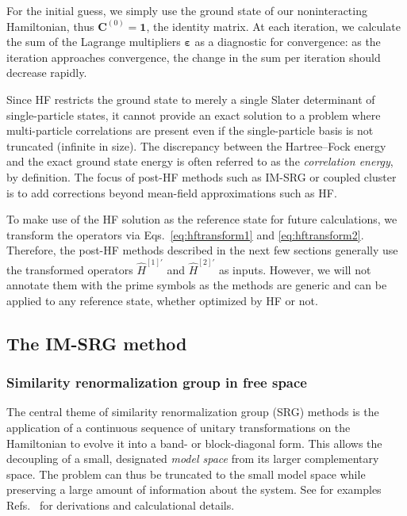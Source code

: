For the initial guess, we simply use the ground state of our noninteracting Hamiltonian, thus $\bm{C}^{(0)} = \bm{1}$, the identity matrix.  At each iteration, we calculate the sum of the Lagrange multipliers $\bm{\varepsilon}$ as a diagnostic for convergence: as the iteration approaches convergence, the change in the sum per iteration should decrease rapidly.

Since HF restricts the ground state to merely a single Slater determinant of single-particle states, it cannot provide an exact solution to a problem where multi-particle correlations are present even if the single-particle basis is not truncated (infinite in size).  The discrepancy between the Hartree--Fock energy and the exact ground state energy is often referred to as the \textit{correlation energy}, by definition.  The focus of post-HF methods such as IM-SRG or coupled cluster is to add corrections beyond mean-field approximations such as HF.

To make use of the HF solution as the reference state for future calculations, we transform the operators via Eqs.\ \eqref{eq:hftransform1} and \eqref{eq:hftransform2}.  Therefore, the post-HF methods described in the next few sections generally use the transformed operators $\hat{H}^{[1] \prime}$ and $\hat{H}^{[2] \prime}$ as inputs.  However, we will not annotate them with the prime symbols as the methods are generic and can be applied to any reference state, whether optimized by HF or not.

\subsection{The IM-SRG method}
\label{subsec:imsrgmethod}

\subsubsection{Similarity renormalization group in free space}
\label{subsubsec:srgmethods}

The central theme of similarity renormalization group (SRG) methods is the application of a continuous sequence of unitary transformations on the Hamiltonian to evolve it into a band- or block-diagonal form.  This allows the decoupling of a small, designated \textit{model space} from its larger complementary space.  The problem can thus be truncated to the small model space while preserving a large amount of information about the system.  See for examples Refs.\ \cite{kehrein2006flow,Hergert2016165,lnp936} for derivations and calculational details.

